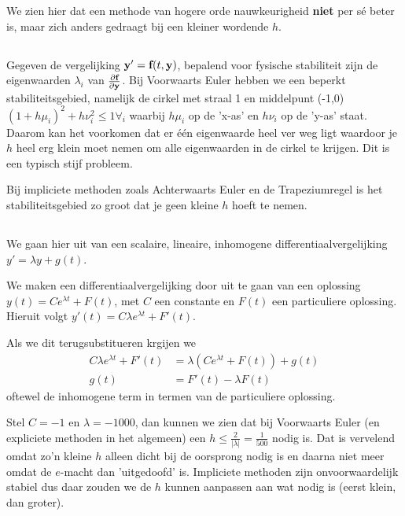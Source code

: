 \documentclass{2wn20summary}
\begin{document}
		  We zien hier dat een methode van hogere orde nauwkeurigheid \textbf{niet} per s\'e beter %
		   is, maar zich anders gedraagt bij een kleiner wordende $h$.
		  
	\subsection{}
		Gegeven de vergelijking ${\textbf{y}}'={\textbf{f}} (t,{\textbf{y}} )$, bepalend voor fysische stabiliteit zijn de eigenwaarden $\lambda_i$ van $\frac{\partial {\textbf{f}}  }{\partial {\textbf{y}} }$. Bij Voorwaarts Euler hebben we een beperkt stabiliteitsgebied, namelijk de cirkel met straal 1 en middelpunt (-1,0) $(1+h \mu_i)^2 +h \nu_i^2 \le 1 \forall_i$ waarbij $h\mu_i$ op de 'x-as' en $h \nu_i$ op de 'y-as' staat. Daarom kan het voorkomen dat er \'e\'en eigenwaarde heel ver weg ligt waardoor je $h$ heel erg klein moet nemen om alle eigenwaarden in de cirkel te krijgen. Dit is een typisch stijf probleem.		  
		
		Bij impliciete methoden zoals Achterwaarts Euler en de Trapeziumregel is het stabiliteitsgebied zo groot dat je geen kleine $h$ hoeft te nemen.
		
	\subsection{}
	
		We gaan hier uit van een scalaire, lineaire, inhomogene differentiaalvergelijking $y'=\lambda y + g(t)$.
		
		We maken een differentiaalvergelijking door uit te gaan van een oplossing $y(t) = C e^{\lambda t} +F(t)$, met $C$ een constante en $F(t)$ een particuliere oplossing. Hieruit volgt $y'(t) = C\lambda e^{\lambda t} + F'(t)$.
		
		Als we dit terugsubstitueren krgijen we
		\begin{align*}
			C \lambda e^{\lambda t} + F'(t) &= \lambda (C e^{\lambda t} +F(t)) + g(t) \\
			g(t) &= F'(t) - \lambda F(t)
		\end{align*}
		oftewel de inhomogene term in termen van de particuliere oplossing.
		
		\begin{voorbeeld}
			Stel $C=-1$ en $\lambda = -1000$, dan kunnen we zien dat bij Voorwaarts Euler (en expliciete methoden in het algemeen) een $h\le \frac{2}{|\lambda|} = \frac{1}{500}$ nodig is. Dat is vervelend omdat zo'n kleine $h$ alleen dicht bij de oorsprong nodig is en daarna niet meer omdat de $e$-macht dan 'uitgedoofd' is. Impliciete methoden zijn onvoorwaardelijk stabiel dus daar zouden we de $h$ kunnen aanpassen aan wat nodig is (eerst klein, dan groter).
		\end{voorbeeld}
		
\end{document}
